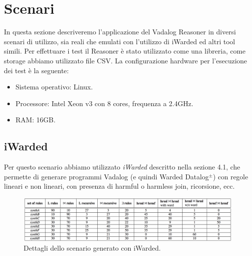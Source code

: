 \section{Scenari}

In questa sezione descriveremo l'applicazione del Vadalog Reasoner in diversi scenari di utilizzo, sia reali che emulati con l'utilizzo di iWarded ed altri tool simili.\newline
Per effettuare i test il Reasoner è stato utilizzato come una libreria, come storage abbiamo utilizzato file CSV. \newline
La configurazione hardware per l'esecuzione dei test è la seguente:
\begin{itemize}
	\item Sistema operativo: Linux.
	\item Processore: Intel Xeon v3 con 8 cores, frequenza a 2.4GHz.
	\item RAM: 16GB.
\end{itemize}

\subsection{iWarded}

Per questo scenario abbiamo utilizzato \emph{iWarded} descritto nella sezione 4.1, che permette di generare programmi Vadalog (e quindi Warded Datalog$^\pm$) con regole lineari e non lineari, con presenza di harmful o harmless join, ricorsione, ecc. \newline
\begin{figure}[h]
	\centering
	\includegraphics[width=0.8\linewidth]{figure/iWardedScenario}
	\caption{Dettagli dello scenario generato con iWarded.}
	\label{fig:iwarded}
\end{figure}

